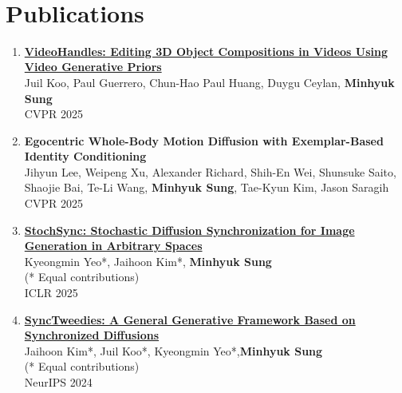 \documentclass[letterpaper,10pt]{article} %
\newcommand{\blankline}{\quad\pagebreak[2]}
\begin{document}
{{\begin{tabular}{r|p{14cm}}
\end{tabular}\\

\blankline



\section{Publications}

\begin{enumerate}

\item \label{cvpr25}
\href{https://www.arxiv.org/abs/2503.01107}{\textbf{VideoHandles: Editing 3D Object Compositions in Videos Using Video Generative Priors}}\\
Juil Koo, Paul Guerrero, Chun-Hao Paul Huang, Duygu Ceylan, \textbf{Minhyuk Sung}\\
CVPR 2025\\
\blankline

\item \label{cvpr25}
\textbf{Egocentric Whole-Body Motion Diffusion with Exemplar-Based Identity Conditioning}\\
Jihyun Lee, Weipeng Xu, Alexander Richard, Shih-En Wei, Shunsuke Saito, Shaojie Bai, Te-Li Wang, \textbf{Minhyuk Sung}, Tae-Kyun Kim, Jason Saragih\\
CVPR 2025\\
\blankline

\item \label{iclr25}
\href{https://arxiv.org/abs/2501.15445}{\textbf{StochSync: Stochastic Diffusion Synchronization for Image Generation in Arbitrary Spaces}}\\
Kyeongmin Yeo*, Jaihoon Kim*, \textbf{Minhyuk Sung}\\
(* Equal contributions)\\
ICLR 2025\\
\blankline

\item \label{neurips24_4}
\href{https://arxiv.org/abs/2403.14370}{\textbf{SyncTweedies: A General Generative Framework Based on Synchronized Diffusions}}\\
Jaihoon Kim*, Juil Koo*, Kyeongmin Yeo*,\textbf{Minhyuk Sung}\\
(* Equal contributions)\\
NeurIPS 2024\\
\blankline


\end{enumerate}}}
\end{document}
